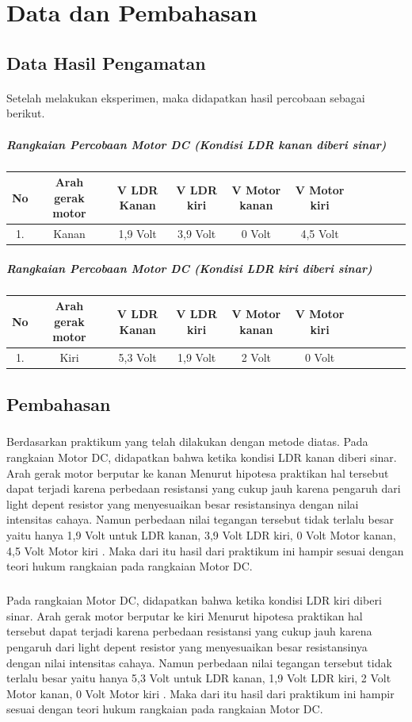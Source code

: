 \documentclass[12pt,a4paper]{article}
\begin{document}
\newpage

\section{Data dan Pembahasan}

\subsection{Data Hasil Pengamatan}
\paragraph{ } Setelah melakukan eksperimen, maka didapatkan hasil percobaan sebagai berikut.

\subparagraph*{Rangkaian Percobaan Motor DC (Kondisi LDR kanan diberi sinar)}
\subparagraph*{ }
\begin{tabular}{|c|c|c|c|c|c|c|c|c|c|c|}        \hline
No & Arah gerak motor & V LDR Kanan & V LDR kiri & V Motor kanan  & V Motor kiri \\ \hline 
1. & Kanan  & 1,9 Volt	& 3,9 Volt	 & 0 Volt 	& 4,5 Volt     \\ \hline
 \end{tabular}
 
\subparagraph*{Rangkaian Percobaan Motor DC (Kondisi LDR kiri diberi sinar)}
\subparagraph*{ }
\begin{tabular}{|c|c|c|c|c|c|c|c|c|c|c|}        \hline
No & Arah gerak motor & V LDR Kanan & V LDR kiri & V Motor kanan  & V Motor kiri \\ \hline 
1. & Kiri   & 5,3 Volt	& 1,9 Volt 	 & 2 Volt		& 0 Volt  	   \\ \hline

 \end{tabular}

\newpage
\subsection{Pembahasan}
\subparagraph{ }
Berdasarkan praktikum yang telah dilakukan dengan metode diatas. Pada rangkaian Motor DC, didapatkan bahwa ketika kondisi LDR kanan diberi sinar. Arah gerak motor berputar ke kanan Menurut hipotesa praktikan hal tersebut dapat terjadi karena perbedaan resistansi yang cukup jauh karena pengaruh dari light depent resistor yang menyesuaikan besar resistansinya dengan nilai intensitas cahaya. Namun perbedaan nilai tegangan tersebut tidak terlalu besar yaitu hanya 1,9 Volt untuk LDR kanan, 3,9 Volt LDR kiri, 0 Volt Motor kanan, 4,5 Volt Motor kiri . Maka dari itu hasil dari praktikum ini hampir sesuai dengan teori hukum rangkaian pada rangkaian Motor DC.
\subparagraph{ }
Pada rangkaian Motor DC, didapatkan bahwa ketika kondisi LDR kiri diberi sinar. Arah gerak motor berputar ke kiri Menurut hipotesa praktikan hal tersebut dapat terjadi karena perbedaan resistansi yang cukup jauh karena pengaruh dari light depent resistor yang menyesuaikan besar resistansinya dengan nilai intensitas cahaya. Namun perbedaan nilai tegangan tersebut tidak terlalu besar yaitu hanya 5,3 Volt untuk LDR kanan, 1,9 Volt LDR kiri, 2 Volt Motor kanan, 0 Volt Motor kiri . Maka dari itu hasil dari praktikum ini hampir sesuai dengan teori hukum rangkaian pada rangkaian Motor DC.
\newpage
 
\end{document}
